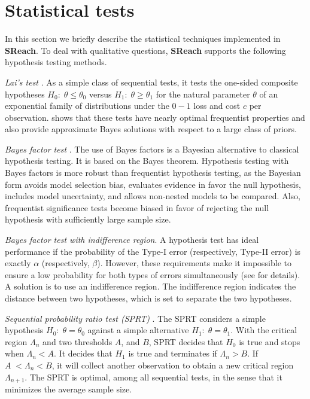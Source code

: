
\section{Statistical tests}\label{apndx:stat}
In this section we briefly describe the statistical techniques implemented in {\bf SReach}.
To deal with qualitative questions, {\bf SReach} supports the following hypothesis testing methods.

\textit{Lai's test} \cite{lai1988nearly}.
As a simple class of sequential tests, it tests the one-sided composite hypotheses $H_0: \; \theta \leq \theta_0$ versus $H_1:\; \theta \geq \theta_1$ for the natural parameter $\theta$ of an exponential family of distributions under the $0-1$ loss and cost $c$ per observation. \cite{lai1988nearly} shows that these tests have nearly optimal frequentist properties and also provide approximate Bayes solutions with respect to a large class of priors. 

\textit{Bayes factor test} \cite{kass1995bayes}.
The use of Bayes factors is a Bayesian alternative to classical hypothesis testing. It is based on the Bayes theorem. Hypothesis testing with Bayes factors is more robust than frequentist hypothesis testing, as the Bayesian form avoids model selection bias, evaluates evidence in favor the null hypothesis, includes model uncertainty, and allows non-nested models to be compared. Also, frequentist significance tests become biased in favor of rejecting the null hypothesis with sufficiently large sample size. 

\textit{Bayes factor test with indifference region}. 
A hypothesis test has ideal performance if the probability of the Type-I error (respectively, Type-II error) is exactly $\alpha$ (respectively, $\beta$). However, these requirements make it impossible to ensure a low probability for both types of errors simultaneously (see \cite{younes2005verification} for details). A solution is to use an indifference region. The indifference region indicates the distance between two hypotheses, which is set to separate the two hypotheses.

\textit{Sequential probability ratio test (SPRT)} \cite{wald1945sequential}. 
The SPRT considers a simple hypothesis $H_0:\;\theta = \theta_0$ against a simple alternative $H_1:\;\theta = \theta_1$. With the critical region $\Lambda_n$ and two thresholds $A$, and $B$, SPRT decides that $H_0$ is true and stops when $\Lambda_n < A$. It decides that $H_1$ is true and terminates if $\Lambda_n > B$. If $A\; < \Lambda_n < B$, it will collect another observation to obtain a new critical region $\Lambda_{n+1}$. The SPRT is optimal, among all sequential tests, in the sense that it minimizes the average sample size.

